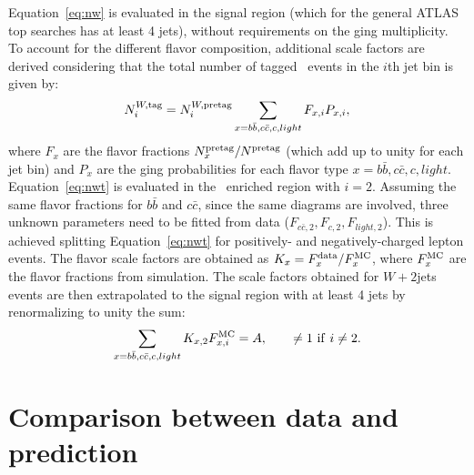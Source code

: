 Equation~\ref{eq:nw} is evaluated in the signal region (which for 
the general ATLAS top searches has at least 4 jets), 
without requirements on the \btag ging multiplicity.
To account for the different flavor composition, additional scale factors are derived 
considering that the total number of tagged \wjets\ 
events in the $i$th jet bin is given by:
\begin{equation}\label{eq:nwt}
N^{W,{\rm tag}}_{i}  = 
N^{W,{\rm pretag}}_{i}
\sum_{x=b\bar{b}, c\bar{c}, c, light} F_{x,i}P_{x,i},
\end{equation}
where $F_x$ are the flavor fractions $N^{\rm pretag}_x/N^{\rm pretag}$ 
(which add up to unity for each jet bin) and 
$P_x$ are the \btag ging probabilities for each flavor 
type $x = b\bar{b}, c\bar{c}, c, light$.
Equation~\ref{eq:nwt} is evaluated in the \wjets\ enriched
region with $i=2$.
Assuming the same flavor fractions for  $b\bar{b}$ and $c\bar{c}$,
since the same diagrams are involved, three unknown parameters need
to be fitted from data ($F_{c\bar{c},2}, F_{c,2}, F_{light,2}$).
This is achieved splitting Equation~\ref{eq:nwt} 
for positively- and negatively-charged lepton events. 
The flavor scale factors
are obtained as $K_x = F^{\rm data}_x/F^{\rm MC}_x$, where
$F^{\rm MC}_x$ are the flavor fractions from simulation.
The scale factors obtained for $W+2$jets events 
are then extrapolated to the
signal region with at least 4 jets by renormalizing to
unity the sum: 
\begin{equation}\label{eq:sfwn}
\sum_{x = b\bar{b}, c\bar{c}, c, light} K_{x,2} F_{x, i}^{\rm MC} = A, \qquad \neq 1 {\rm\ if\ } i \neq 2.
\end{equation}






\section{Comparison between data and prediction}\label{sec:datamcpresel}

